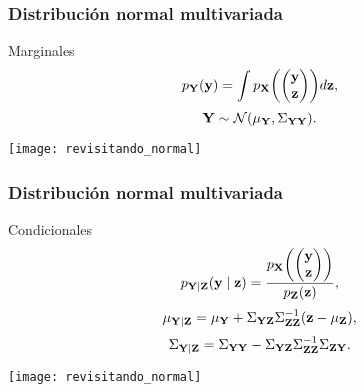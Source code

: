 \documentclass[table]{beamer}
\begin{document}
\begin{frame}
    \frametitle{Distribución normal multivariada}
    \begin{block}{Marginales}
        \begin{equation*}
            \ppdf{\Yvec}{\yvec} = \int \ppdf{\Xvec}{\begin{pmatrix} \yvec \\ \zvec \end{pmatrix}} d \zvec ,
        \end{equation*}
        \begin{equation*}
        \Yvec \sim \normal{\mu_{\Yvec}}{\Sigma_{\Yvec \Yvec}} .
        \end{equation*}
    \end{block}
    \begin{center}
        \texttt{[image: revisitando\_normal]}
    \end{center}
\end{frame}

\begin{frame}
    \frametitle{Distribución normal multivariada}
    \begin{block}{Condicionales}
        \begin{equation*}
            \ppdf{\Yvec \mid \Zvec}{\yvec \mid \zvec} = \frac{\ppdf{\Xvec}{\begin{pmatrix} \yvec \\ \zvec \end{pmatrix}}}{\ppdf{\Zvec}{\zvec}} ,
        \end{equation*}
        \begin{equation*}
            \mu_{\Yvec \mid \Zvec} = \mu_{\Yvec} + \Sigma_{\Yvec \Zvec} \Sigma_{\Zvec \Zvec}^{-1} \parens{\zvec - \mu_{\Zvec}} ,
        \end{equation*}
        \begin{equation*}
            \Sigma_{\mathbf{Y} \mid \mathbf{Z}} = \Sigma_{\mathbf{Y} \mathbf{Y}} - \Sigma_{\mathbf{Y} \mathbf{Z}} \Sigma_{\mathbf{Z} \mathbf{Z}}^{-1} \Sigma_{\mathbf{Z} \mathbf{Y}} .
        \end{equation*}
    \end{block}
    \begin{center}
        \texttt{[image: revisitando\_normal]}
    \end{center}
\end{frame}
\end{document}
